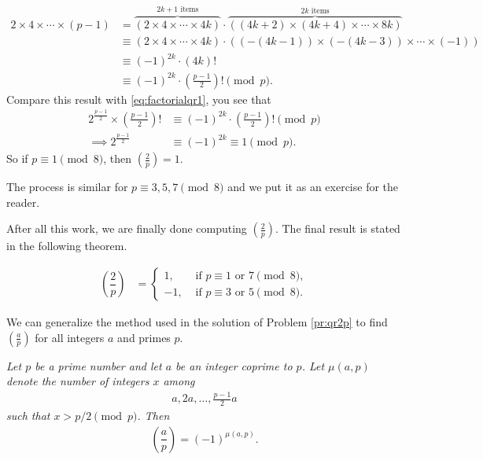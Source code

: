 \documentclass[main.tex]{subfile}
\begin{document}
\begin{solution}
			\begin{align*}
				2 \times 4 \times \cdots \times (p-1)
					&= \overbrace{\left(2 \times 4 \times \cdots \times 4k\right)}^{2k+1 \text{ items}} \cdot \overbrace{\left((4k+2) \times (4k+4) \times \cdots \times 8k\right)}^{2k \text{ items}}\\
					& \equiv \left(2 \times 4 \times \cdots \times 4k\right) \cdot \left((-(4k-1)) \times (-(4k-3)) \times \cdots \times (-1)\right) \\
					& \equiv (-1)^{2k} \cdot (4k)!\\
					& \equiv (-1)^{2k} \cdot \left(\frac{p-1}{2}\right)! \pmod p.
			\end{align*} 
		Compare this result with \eqref{eq:factorialqr1}, you see that
			\begin{align*}
				2^\frac{p-1}{2} \times \left(\frac{p-1}{2}\right)!
					& \equiv (-1)^{2k} \cdot \left(\frac{p-1}{2}\right)! \pmod p\\
				\implies 2^\frac{p-1}{2}
					& \equiv (-1)^{2k} \equiv 1 \pmod p.
			\end{align*}
		So if $p \equiv 1 \pmod 8$, then $ \left(\frac{2}{p}\right)=1$.
		
		The process is similar for $p \equiv 3, 5, 7 \pmod 8$ and we put it as an exercise for the reader. 
		
		After all this work, we are finally done computing $ \left(\frac{2}{p}\right)$. The final result is stated in the following theorem.
		
		\begin{theorem}\slshape\label{thm:2qr}
			\begin{align*}
			\left(\dfrac{2}{p}\right) 
			& = 
			\begin{cases}
			1,&\mbox{ if } p \equiv 1 \mbox{ or } 7\pmod 8,\\
			-1,&\mbox{ if } p \equiv 3 \mbox{ or } 5\pmod 8.
			\end{cases}
			\end{align*}
		\end{theorem}
		
	\end{solution}
We can generalize the method used in the solution of Problem \ref{pr:qr2p} to find $ \left(\frac{a}{p}\right)$ for all integers $a$ and primes $p$.
	\begin{theorem}\slshape\label{thm:gausscriterion}
		Let $p$ be a prime number and let $a$ be an integer coprime to $p$. Let $\mu(a,p)$ denote the number of integers $x$ among
		\begin{align*}
		a, 2a, \ldots, \frac{p-1}{2}a
		\end{align*}
		such that $\displaystyle x > p/2 \pmod p$. Then
		\begin{align*}
		\left(\dfrac{a}{p}\right) = (-1)^{\mu(a,p)}.
		\end{align*}
	\end{theorem}
	
\end{document}
